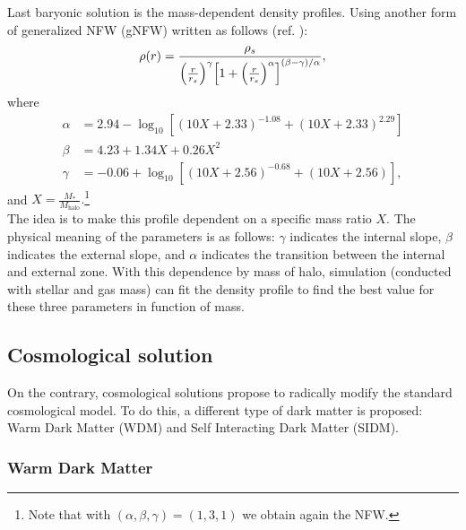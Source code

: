 Last baryonic solution is the mass-dependent density profiles. Using another form of generalized NFW (gNFW) written as follows (ref. \cite{Cusp-Core-Problem-Del-Popolo}):
\begin{equation}
    \rho(r) = \frac{\rho_s}{\qty(\frac{r}{r_s})^\gamma \qty[1+ \qty(\frac{r}{r_s})^\alpha]^{(\beta-\gamma)/\alpha}},
\end{equation}
where 
\begin{align}
\alpha &= 2.94 - \log_{10} \left[ (10X + 2.33)^{-1.08} + (10X + 2.33)^{2.29} \right] \nonumber \\
\beta  &= 4.23 + 1.34X + 0.26X^{2} \\
\gamma &= -0.06 + \log_{10} \left[ (10X + 2.56)^{-0.68} + (10X + 2.56) \right], \nonumber
\end{align}
and $X = \frac{M_*}{M_{\text{halo}}}.$\footnote{Note that with $(\alpha, \beta, \gamma) = (1,3,1)$ we obtain again the NFW.}\\ The idea is to make this profile dependent on a specific mass ratio $X$. The physical meaning of the parameters is as follows: $\gamma$ indicates the internal slope, $\beta$ indicates the external slope, and $\alpha$ indicates the transition between the internal and external zone. With this dependence by mass of halo, simulation (conducted with stellar and gas mass) can fit the density profile to find the best value for these three parameters in function of mass.


\subsection{Cosmological solution}

On the contrary, cosmological solutions propose to radically modify the standard cosmological model. To do this, a different type of dark matter is proposed: Warm Dark Matter (WDM) and Self Interacting Dark Matter (SIDM).

\subsubsection{Warm Dark Matter}

